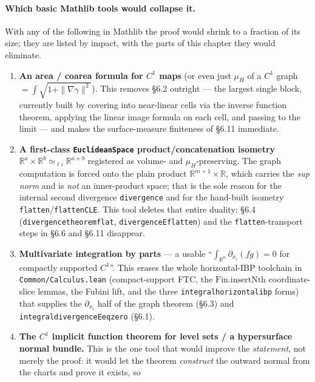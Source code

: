 ﻿\documentclass[12pt, a4paper]{article}
\renewcommand{\_}{\origunderscore\allowbreak}
\theoremstyle{definition}
\theoremstyle{plain}
\begin{document}
\paragraph{Which basic Mathlib tools would collapse it.}
With any of the following in Mathlib the proof would shrink to a fraction of its size; they are
listed by impact, with the parts of this chapter they would eliminate.

\begin{enumerate}
  \item \textbf{An area / coarea formula for $C^1$ maps} (or even just $\mu_H$ of a $C^1$ graph
    $=\int\sqrt{1+\|\nabla\gamma\|^2}$). This removes \S6.2 outright --- the largest single block,
    currently built by covering into near-linear cells via the inverse function theorem, applying
    the linear image formula on each cell, and passing to the limit --- and makes the
    surface-measure finiteness of \S6.11 immediate.
  \item \textbf{A first-class \texttt{EuclideanSpace} product/concatenation isometry}
    $\mathbb{R}^a\times\mathbb{R}^b\simeq_{\ell i}\mathbb{R}^{a+b}$ registered as volume- and
    $\mu_H$-preserving. The graph computation is forced onto the plain product
    $\mathbb{R}^{m+1}\times\mathbb{R}$, which carries the \emph{sup norm} and is \emph{not} an
    inner-product space; that is the sole reason for the internal second divergence \texttt{divergence}
    and for the hand-built isometry \texttt{flatten}/\texttt{flattenCLE}. This tool deletes that entire
    duality: \S6.4 (\texttt{divergence\_theorem\_flat}, \texttt{divergenceE\_flatten}) and the
    \texttt{flatten}-transport steps in \S6.6 and \S6.11 disappear.
  \item \textbf{Multivariate integration by parts} --- a usable
    ``$\int_{\mathbb{R}^n}\partial_{x_i}(fg)=0$ for compactly supported $C^1$''. This erases the
    whole horizontal-IBP toolchain in \texttt{Common/\allowbreak Calculus.\allowbreak lean}
    (compact-support FTC, the $\mathrm{Fin.insertNth}$ coordinate-slice lemmas, the Fubini lift, and
    the three \texttt{integral\_horizontal\_ibp} forms) that supplies the $\partial_{x_i}$ half of the
    graph theorem (\S6.3) and \texttt{integral\_divergenceE\_eq\_zero} (\S6.1).
  \item \textbf{The $C^1$ implicit function theorem for level sets / a hypersurface normal bundle.}
    This is the one tool that would improve the \emph{statement}, not merely the proof: it would let
    the theorem \emph{construct} the outward normal from the charts and prove it exists, so

\end{enumerate}
\end{document}
